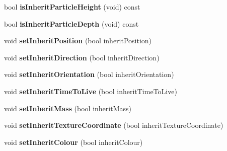 \begin{DoxyCompactItemize}
bool {\bfseries is\+Inherit\+Particle\+Height} (void) const
\item 
\mbox{\label{classPUDoPlacementParticleEventHandler_a380825f718dbe1a9e51b714c0205115c}} 
bool {\bfseries is\+Inherit\+Particle\+Depth} (void) const
\item 
\mbox{\label{classPUDoPlacementParticleEventHandler_a843fb6c63398c16a7d899bfa3a179fe7}} 
void {\bfseries set\+Inherit\+Position} (bool inherit\+Position)
\item 
\mbox{\label{classPUDoPlacementParticleEventHandler_a39dfbaab53f18c3285a7f4bfd5d30ba1}} 
void {\bfseries set\+Inherit\+Direction} (bool inherit\+Direction)
\item 
\mbox{\label{classPUDoPlacementParticleEventHandler_a0b04e537832bb00a8c4b6df36f979379}} 
void {\bfseries set\+Inherit\+Orientation} (bool inherit\+Orientation)
\item 
\mbox{\label{classPUDoPlacementParticleEventHandler_a9211c3459fb0553ba8ce1827bc6960ad}} 
void {\bfseries set\+Inherit\+Time\+To\+Live} (bool inherit\+Time\+To\+Live)
\item 
\mbox{\label{classPUDoPlacementParticleEventHandler_a930f739b72321162c18656947e4209ad}} 
void {\bfseries set\+Inherit\+Mass} (bool inherit\+Mass)
\item 
\mbox{\label{classPUDoPlacementParticleEventHandler_a6e1b5c7dbced7fbd5a0bc29dcd2c5427}} 
void {\bfseries set\+Inherit\+Texture\+Coordinate} (bool inherit\+Texture\+Coordinate)
\item 
\mbox{\label{classPUDoPlacementParticleEventHandler_a5a0e89b2e9f97be2961ca18541b1851e}} 
void {\bfseries set\+Inherit\+Colour} (bool inherit\+Colour)
\item 
\mbox{\label{classPUDoPlacementParticleEventHandler_a9ed7bb59f48aaf78fc12ee3a7077d3ee}} 

\end{DoxyCompactItemize}

